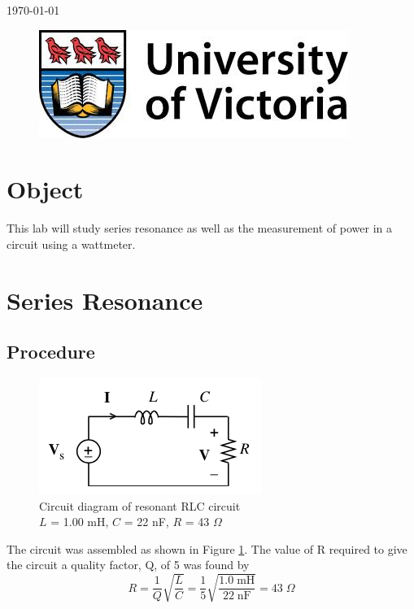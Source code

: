 \documentclass[12pt]{article}
\providecommand{\units}[1]{\;\text{#1}}
\begin{document}
\begin{titlepage}
{\large \today}\\ %

\begin{figure}[b]	 %
	\centering
	\includegraphics[scale=0.3]{UVic_logo}
\end{figure}

\end{titlepage}





\section{Object}\label{sec:object}
This lab will study series resonance as well as the measurement of power in a circuit using a wattmeter.

\section{Series Resonance}\label{sec:resonance}
\subsection{Procedure}\label{sec:res_procedure}
\begin{figure}[h]
	\centering
	\includegraphics[scale=0.75]{resonance_diagram}
	\caption{Circuit diagram of resonant RLC circuit \\ $L$ = 1.00 mH, $C$ = 22 nF, $R$ = 43 $\Omega$}
	\label{fig:res_diagram}
\end{figure}
The circuit was assembled as shown in Figure \ref{fig:res_diagram}. The value of R required to give the circuit a quality factor, Q, of 5 was found by
\begin{equation*}
R=\frac{1}{Q}\sqrt{\frac{L}{C}}=\frac{1}{5}\sqrt{\frac{1.0\units{mH}}{22\units{nF}}}=43\units{$\Omega$}
\end{equation*} 
\end{document}
